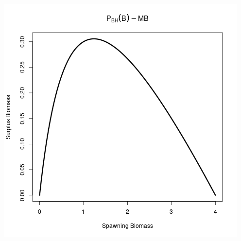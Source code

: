 \documentclass[ xcolor = pdftex, dvipsnames, table ]{beamer}
\begin{document}
\begin{frame}
\begin{minipage}[h!]{0.49\textwidth}
        \includegraphics[width=\textwidth]{../../gpBias/yeildBH.png}
\end{minipage}
\end{frame}
\end{document}
